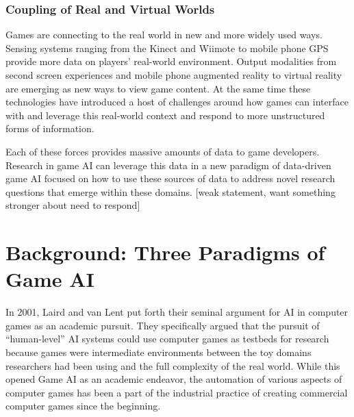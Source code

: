 \documentclass[conference]{IEEEtran}
\begin{document}
\subsubsection{Coupling of Real and Virtual Worlds}
Games are connecting to the real world in new and more widely used ways. Sensing systems ranging from the Kinect and Wiimote to mobile phone GPS provide more data on players' real-world environment. Output modalities from second screen experiences and mobile phone augmented reality to virtual reality are emerging as new ways to view game content. At the same time these technologies have introduced a host of challenges around how games can interface with and leverage this real-world context and respond to more unstructured forms of information.


Each of these forces provides massive amounts of data to game developers. 
Research in game AI can leverage this data in a new paradigm of data-driven game AI focused on how to use these sources of data to address novel research questions that emerge within these domains. [weak statement, want something stronger about need to respond]


\section{Background: Three Paradigms of Game AI}

In 2001, Laird and van Lent \cite{laird2001:gameai} put forth their seminal argument for AI in computer games as an academic pursuit. 
They specifically argued that the pursuit of ``human-level'' AI systems could use computer games as testbeds for research because games were intermediate environments between the toy domains researchers had been using and the full complexity of the real world.
While this opened Game AI as an academic endeavor, the automation of various aspects of computer games has been a part of the industrial practice of creating commercial computer games since the beginning. 
\end{document}
